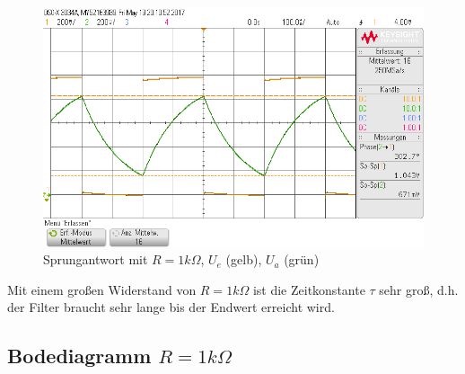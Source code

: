 \begin{figure}[H]
  \begin{center}
    \includegraphics[width=1\textwidth]{./Oszi_Bilder/RLC_Sprung_1k.png}
    \caption{Sprungantwort mit $R=1k\Omega$, $U_e$ (gelb), $U_a$ (gr\"un)}
  \end{center}
\end{figure}
\noindent
Mit einem gro\ss{}en Widerstand von $R=1k\Omega$ ist die Zeitkonstante $\tau$ sehr gro\ss{}, d.h. der Filter braucht sehr lange bis der Endwert erreicht wird.

\subsection{Bodediagramm $R=1k\Omega$}

